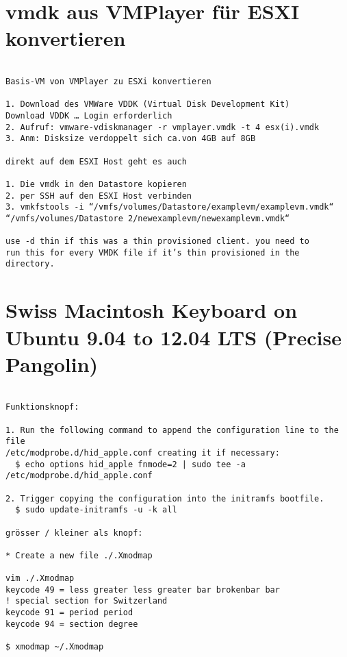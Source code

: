 \documentclass[a4paper,10pt]{report}
\begin{document}
\section{vmdk aus VMPlayer für ESXI konvertieren}
\begin{verbatim}

Basis-VM von VMPlayer zu ESXi konvertieren

1. Download des VMWare VDDK (Virtual Disk Development Kit) 
Download VDDK … Login erforderlich
2. Aufruf: vmware-vdiskmanager -r vmplayer.vmdk -t 4 esx(i).vmdk
3. Anm: Disksize verdoppelt sich ca.von 4GB auf 8GB

direkt auf dem ESXI Host geht es auch

1. Die vmdk in den Datastore kopieren
2. per SSH auf den ESXI Host verbinden
3. vmkfstools -i “/vmfs/volumes/Datastore/examplevm/examplevm.vmdk“ 
“/vmfs/volumes/Datastore 2/newexamplevm/newexamplevm.vmdk“

use -d thin if this was a thin provisioned client. you need to 
run this for every VMDK file if it’s thin provisioned in the directory. 

\end{verbatim}

\section{Swiss Macintosh Keyboard on Ubuntu 9.04 to 12.04 LTS (Precise Pangolin)}
\begin{verbatim}

Funktionsknopf:

1. Run the following command to append the configuration line to the file 
/etc/modprobe.d/hid_apple.conf creating it if necessary: 
  $ echo options hid_apple fnmode=2 | sudo tee -a /etc/modprobe.d/hid_apple.conf

2. Trigger copying the configuration into the initramfs bootfile.
  $ sudo update-initramfs -u -k all
  
grösser / kleiner als knopf:

* Create a new file ./.Xmodmap

vim ./.Xmodmap
keycode 49 = less greater less greater bar brokenbar bar 
! special section for Switzerland
keycode 91 = period period
keycode 94 = section degree

$ xmodmap ~/.Xmodmap
\end{verbatim}
\pagebreak
\end{document}
